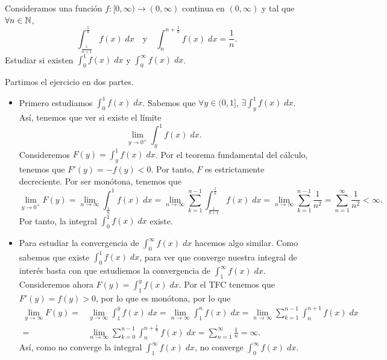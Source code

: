 \documentclass{article}
\begin{document}
\begin{ej}
Consideramos una función $\displaystyle f : [0,\infty) \to (0,\infty) $ continua en $\displaystyle \left(0,\infty\right) $ y tal que $\displaystyle \forall n \in \mathbb{N} $, 
\[\int^{\frac{1}{n}}_{\frac{1}{n+1}} f\left(x\right) \; dx \quad \text{y} \quad \int^{n + \frac{1}{n}}_{n} f\left(x\right) \; dx = \frac{1}{n} .\]
Estudiar si existen $\displaystyle \int^{1}_{0} f\left(x\right) \; dx $ y $\displaystyle \int^{\infty}_{0} f\left(x\right) \; dx $.
\end{ej}
\begin{sol}
Partimos el ejercicio en dos partes. 
\begin{itemize}
	\item Primero estudiamos $\displaystyle \int^{1}_{0} f\left(x\right) \; dx $. Sabemos que $\displaystyle \forall y \in (0,1] $, $\displaystyle \exists \int^{1}_{y} f\left(x\right) \; dx $. Así, tenemos que ver si existe el límite
		\[\lim_{y \to 0^{+}}\int^{1}_{y} f\left(x\right) \; dx .\]
Consideremos $\displaystyle F\left(y\right) = \int^{1}_{y} f\left(x\right) \; dx $. Por el teorema fundamental del cálculo, tenemos que $\displaystyle F'\left(y\right) = -f\left(y\right) < 0  $.
Por tanto, $\displaystyle F $ es estrictamente decreciente. Por ser monótona, tenemos que 
\[\lim_{y \to 0^{+}}F\left(y\right) = \lim_{n \to \infty}\int^{1}_{\frac{1}{n}} f\left(x\right) \; dx = \lim_{n \to \infty}\sum^{n-1}_{k = 1}\int^{\frac{1}{k}}_{\frac{1}{k+1}} f\left(x\right) \; dx = \lim_{n \to \infty}\sum^{n-1}_{k = 1}\frac{1}{n^{2}} = \sum^{\infty}_{n = 1}\frac{1}{n^{2}} < \infty.\]
Por tanto, la integral $\displaystyle \int^{1}_{0} f\left(x\right) \; dx $ existe.
\item Para estudiar la convergencia de $\displaystyle \int^{\infty}_{0} f\left(x\right) \; dx $ hacemos algo similar. Como sabemos que existe $\displaystyle \int^{1}_{0} f\left(x\right) \; dx $, para ver que converge nuestra integral de interés basta con que estudiemos la convergencia de $\displaystyle \int^{\infty}_{1} f\left(x\right) \; dx $.
	Consideremos ahora $\displaystyle F\left(y\right) = \int^{y}_{1} f\left(x\right) \; dx $. Por el TFC tenemos que $\displaystyle F'\left(y\right) = f\left(y\right) > 0 $, por lo que es monótona, por lo que
\[
\begin{split}
	\lim_{y \to \infty}F\left(y\right) = & \lim_{y \to \infty}\int^{y}_{1} f\left(x\right) \; dx = \lim_{n \to \infty}\int^{n}_{1} f\left(x\right) \; dx = \lim_{n \to \infty}\sum^{n-1}_{k = 1}\int^{n + 1}_{n} f\left(x\right) \; dx  \\
	= & \lim_{n \to \infty}\sum^{n-1}_{k = 0}\int^{n + \frac{1}{n}}_{n} f\left(x\right) \; dx = \sum^{\infty}_{n = 1}\frac{1}{n} = \infty.
\end{split}
\]
Así, como no converge la integral $\displaystyle \int^{\infty}_{1} f\left(x\right) \; dx $, no converge $\displaystyle \int^{\infty}_{0} f\left(x\right) \; dx $.
\end{itemize}
\end{sol}
\end{document}
